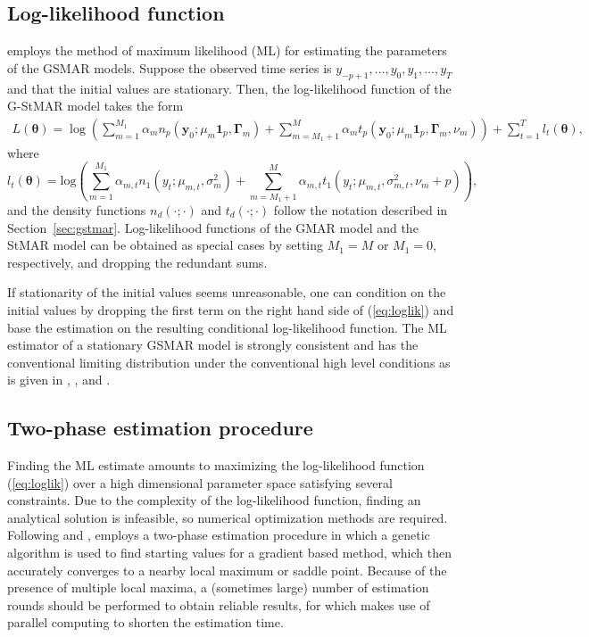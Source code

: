 \documentclass[nojss]{jss} %
\begin{document}
\subsection{Log-likelihood function}\label{sec:loglik}
 employs the method of maximum likelihood (ML) for estimating the parameters of the GSMAR models. Suppose the observed time series is $y_{-p+1},...,y_0,y_1,...,y_T$ and that the initial values are stationary. Then, the log-likelihood function of the G-StMAR model takes the form
\begin{multline}\label{eq:loglik}
L(\boldsymbol{\theta})=
\log\left(\sum_{m=1}^{M_1}\alpha_m n_p(\boldsymbol{y}_0;\mu_m\mathbf{1}_p,\boldsymbol{\Gamma}_m)+\sum_{m=M_1+1}^{M}\alpha_m t_p(\boldsymbol{y}_0;\mu_m\mathbf{1}_p,\boldsymbol{\Gamma}_m,\nu_m) \right)+\sum_{t=1}^{T}l_t(\boldsymbol{\theta}),
\end{multline}
where
\begin{equation}\label{eq:loglik2}
l_t(\boldsymbol{\theta})=\text{log}\left(\sum_{m=1}^{M_1}\alpha_{m,t}n_1(y_t;\mu_{m,t},\sigma_m^2)+\sum_{m=M_1+1}^{M}\alpha_{m,t} t_1\left(y_t;\mu_{m,t},\sigma_{m,t}^2,\nu_m+p\right)\right),
\end{equation}
and the density functions $n_d(\cdot;\cdot)$ and $t_d\left(\cdot;\cdot\right)$ follow the notation described in Section~\ref{sec:gstmar}. Log-likelihood functions of the GMAR model and the StMAR model can be obtained as special cases by setting $M_1=M$ or $M_1=0$, respectively, and dropping the redundant sums.

If stationarity of the initial values seems unreasonable, one can condition on the initial values by dropping the first term on the right hand side of (\ref{eq:loglik}) and base the estimation on the resulting conditional log-likelihood function. The ML estimator of a stationary GSMAR model is strongly consistent and has the conventional limiting distribution under the conventional high level conditions as is given in \citet[pp.254-255]{Kalliovirta+Meitz+Saikkonen:2015}, \citet[Theorem 3]{Meitz+Preve+Saikkonen:2021}, and \citet[Theorem 2]{Virolainen:2020}.

\subsection{Two-phase estimation procedure}\label{sec:estimscheme}
Finding the ML estimate amounts to maximizing the log-likelihood function (\ref{eq:loglik}) over a high dimensional parameter space satisfying several constraints. Due to the complexity of the log-likelihood function, finding an analytical solution is infeasible, so numerical optimization methods are required. Following \cite{Dorsey+Mayer:1995} and \cite{Meitz+Preve+Saikkonen:2021, Meitz+Preve+Saikkonen2:2018},  employs a two-phase estimation procedure in which a genetic algorithm is used to find starting values for a gradient based method, which then accurately converges to a nearby local maximum or saddle point. Because of the presence of multiple local maxima, a (sometimes large) number of estimation rounds should be performed to obtain reliable results, for which  makes use of parallel computing to shorten the estimation time.
\end{document}
